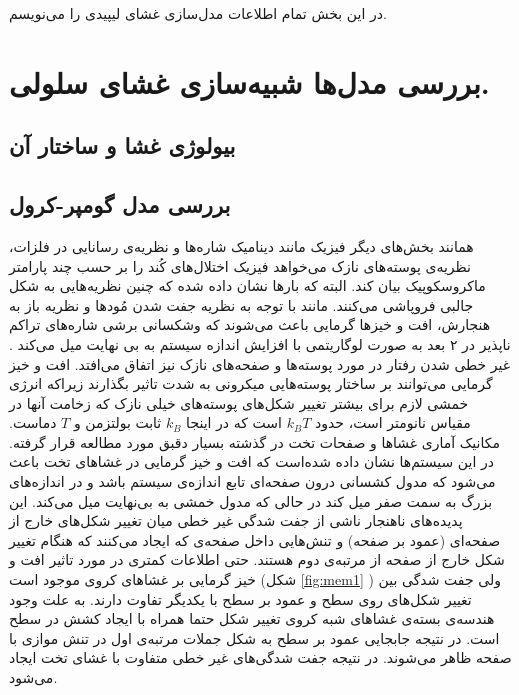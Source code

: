 \setRL
\clearpage
{} 



در این بخش تمام اطلاعات مدل‌سازی غشای لیپیدی را می‌نویسم.


\section{
بررسی مدل‌ها شبیه‌سازی غشای سلولی.
}
\subsection{
بیولوژی غشا و ساختار آن
}
\subsection{
بررسی مدل گومپر-کرول
}
همانند بخش‌های دیگر فیزیک مانند دینامیک شاره‌ها و نظریه‌ی رسانایی در فلزات، نظریه‌ی پوسته‌های نازک می‌خواهد فیزیک اختلال‌های کُند را بر حسب چند پارامتر ماکروسکوپیک بیان کند. البته که بارها نشان داده شده که چنین نظریه‌هایی به شکل‌ جالبی فروپاشی می‌کنند. مانند با توجه به نظریه جفت شدن مُود‌ها و نظریه باز به هنجارش، افت و خیز‌ها گرمایی باعث می‌شوند که وشکسانی برشی
شاره‌های تراکم ناپذیر در ۲ بعد به صورت لوگاریتمی با افزایش اندازه سیستم به بی نهایت میل می‌کند 
\cite{gomppernelson2012}
. غیر خطی شدن رفتار در مورد پوسته‌ها و صفحه‌های نازک نیز اتفاق می‌افتد. افت و خیز گرمایی می‌توانند بر ساختار پوسته‌هایی میکرونی به شدت تاثیر بگذارند زیراکه انرژی خمشی لازم برای بیشتر تغییر شکل‌های پوسته‌های خیلی نازک که زخامت آنها در مقیاس نانومتر است، حدود $k_BT$ است که در اینجا $k_B$ ثابت بولتزمن و
$T$
دماست. مکانیک آماری غشاها و صفحات تخت در گذشته بسیار دقبق مورد مطالعه قرار گرفته. در این سیستم‌ها نشان داده شده‌است که افت و خیز گرمایی در غشاهای تخت باعث می‌شود که مدول کشسانی درون صفحه‌ای
 تابع اندازه‌‌ی سیستم باشد و در اندازه‌های بزرگ به سمت صفر میل کند در حالی که مدول خمشی به بی‌نهایت میل می‌کند. این پدیده‌های ناهنجار ناشی از جفت شدگی غیر خطی میان تغییر شکل‌های خارج از صفحه‌ای (عمود بر صفحه) و تنش‌هایی داخل صفحه‌ی که ایجاد می‌کنند که هنگام تغییر شکل خارج از صفحه از مرتبه‌ی دوم هستند. حتی اطلاعات کمتری در مورد تاثیر افت و خیز گرمایی بر غشا‌های کروی موجود است (شکل 
 \ref{fig:mem1}
)
ولی جفت شدگی بین تغییر شکل‌های روی سطح و عمود بر سطح با یکدیگر تفاوت دارند. به علت وجود هندسه‌ی بسته‌ی غشاهای شبه کروی تغییر شکل حتما همراه با ایجاد کشش در سطح است. در نتیجه جابجایی عمود بر سطح به شکل جملات مرتبه‌ی اول در تنش موازی با صفحه ظاهر می‌شوند. در نتیجه جفت‌ شدگی‌های غیر خطی متفاوت با غشای تخت ایجاد می‌‌شود.

